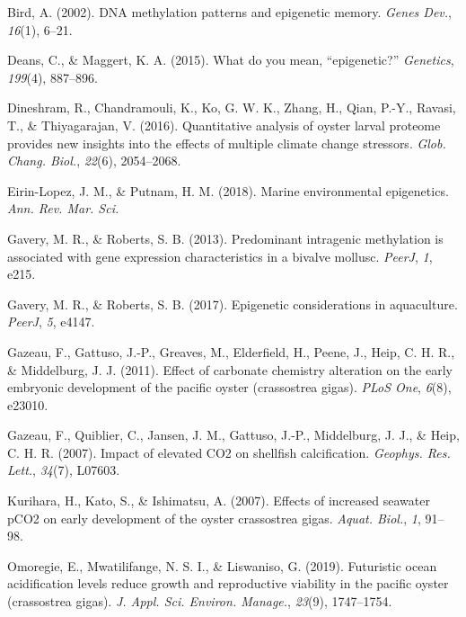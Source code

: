 \documentclass [11pt, proquest] {uwthesis}[2015/03/03]
\newlength{\cslhangindent}
\newenvironment{CSLReferences}%
{\setlength{\parindent}{0pt}%
\everypar{\setlength{\hangindent}{\cslhangindent}}\ignorespaces}%
{\par}
\begin{document}
\hypertarget{refs}{}
\begin{CSLReferences}{1}{0}
\leavevmode\hypertarget{ref-Bird2002}{}%
Bird, A. (2002). {DNA} methylation patterns and epigenetic memory. \emph{Genes Dev.}, \emph{16}(1), 6--21.

\leavevmode\hypertarget{ref-Deans2015}{}%
Deans, C., \& Maggert, K. A. (2015). What do you mean, {``epigenetic?''} \emph{Genetics}, \emph{199}(4), 887--896.

\leavevmode\hypertarget{ref-Dineshram2016}{}%
Dineshram, R., Chandramouli, K., Ko, G. W. K., Zhang, H., Qian, P.-Y., Ravasi, T., \& Thiyagarajan, V. (2016). Quantitative analysis of oyster larval proteome provides new insights into the effects of multiple climate change stressors. \emph{Glob. Chang. Biol.}, \emph{22}(6), 2054--2068.

\leavevmode\hypertarget{ref-Eirin-Lopez2018}{}%
Eirin-Lopez, J. M., \& Putnam, H. M. (2018). Marine environmental epigenetics. \emph{Ann. Rev. Mar. Sci.}

\leavevmode\hypertarget{ref-Gavery2013}{}%
Gavery, M. R., \& Roberts, S. B. (2013). Predominant intragenic methylation is associated with gene expression characteristics in a bivalve mollusc. \emph{PeerJ}, \emph{1}, e215.

\leavevmode\hypertarget{ref-Gavery2017}{}%
Gavery, M. R., \& Roberts, S. B. (2017). Epigenetic considerations in aquaculture. \emph{PeerJ}, \emph{5}, e4147.

\leavevmode\hypertarget{ref-Gazeau2011}{}%
Gazeau, F., Gattuso, J.-P., Greaves, M., Elderfield, H., Peene, J., Heip, C. H. R., \& Middelburg, J. J. (2011). Effect of carbonate chemistry alteration on the early embryonic development of the pacific oyster (crassostrea gigas). \emph{PLoS One}, \emph{6}(8), e23010.

\leavevmode\hypertarget{ref-Gazeau2007}{}%
Gazeau, F., Quiblier, C., Jansen, J. M., Gattuso, J.-P., Middelburg, J. J., \& Heip, C. H. R. (2007). Impact of elevated {CO2} on shellfish calcification. \emph{Geophys. Res. Lett.}, \emph{34}(7), L07603.

\leavevmode\hypertarget{ref-Kurihara2007}{}%
Kurihara, H., Kato, S., \& Ishimatsu, A. (2007). Effects of increased seawater {pCO2} on early development of the oyster crassostrea gigas. \emph{Aquat. Biol.}, \emph{1}, 91--98.

\leavevmode\hypertarget{ref-Omoregie2019}{}%
Omoregie, E., Mwatilifange, N. S. I., \& Liswaniso, G. (2019). Futuristic ocean acidification levels reduce growth and reproductive viability in the pacific oyster (crassostrea gigas). \emph{J. Appl. Sci. Environ. Manage.}, \emph{23}(9), 1747--1754.


\end{CSLReferences}
\end{document}
